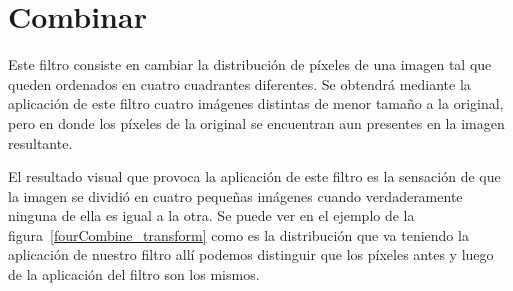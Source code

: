 \section{Combinar}
Este filtro consiste en cambiar la distribución de píxeles de una imagen tal que queden ordenados en cuatro cuadrantes diferentes. Se obtendrá mediante la aplicación de este filtro cuatro imágenes distintas de menor tamaño a la original, pero en donde los píxeles de la original se encuentran aun presentes en la imagen resultante.

El resultado visual que provoca la aplicación de este filtro es la sensación de que la imagen se dividió en cuatro pequeñas imágenes cuando verdaderamente ninguna de ella es igual a la otra. 
Se puede ver en el ejemplo de la figura~\ref{fourCombine_transform} como es la distribución que va teniendo la aplicación de nuestro filtro allí podemos distinguir que los píxeles antes y luego de la aplicación del filtro son los mismos.

